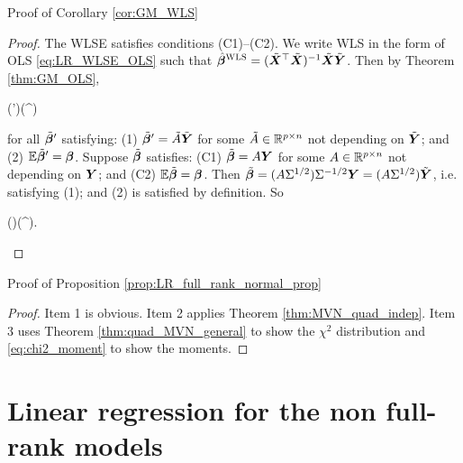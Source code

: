 \documentclass[10pt,a4paper]{book}
\begin{document}
\begin{pfbox}{Proof of Corollary \ref{cor:GM_WLS}}
	\begin{proof}
		The WLSE satisfies conditions (C1)--(C2).
		We write WLS in the form of OLS \eqref{eq:LR_WLSE_OLS} such that $\hat{{\boldsymbol\beta}}^{\textsc{WLS}}=(\tilde{{\boldsymbol X}}^\top\tilde{{\boldsymbol X}})^{-1}\tilde{{\boldsymbol X}}\tilde{{\boldsymbol Y}}$. 
		Then by Theorem \ref{thm:GM_OLS}, 
		\begin{sequation*}
			\Cov(\tilde{\bab}')\succeq \Cov(\hat{\bab}^{\WLS})
		\end{sequation*}
		for all $\tilde{{\boldsymbol\beta}}'$ satisfying: (1) $\tilde{{\boldsymbol\beta}}'=\tilde{A}\tilde{{\boldsymbol Y}}$ for some $\tilde{A}\in\mathbb R^{p\times n}$ not depending on $\tilde{{\boldsymbol Y}}$; and (2) $\mathbb E\tilde{{\boldsymbol\beta}}'={\boldsymbol\beta}$.
		Suppose $\tilde{{\boldsymbol\beta}}$ satisfies: (C1) $\tilde{{\boldsymbol\beta}}=A{\boldsymbol Y}$ for some $A\in\mathbb R^{p\times n}$ not depending on ${\boldsymbol Y}$; and (C2) $\mathbb E\tilde{{\boldsymbol\beta}}={\boldsymbol\beta}$.
		Then $\tilde{{\boldsymbol\beta}}=(A\Sigma^{1/2})\Sigma^{-1/2}{\boldsymbol Y}=(A\Sigma^{1/2})\tilde{{\boldsymbol Y}}$, i.e. satisfying (1); and (2) is satisfied by definition. 
		So 
		\begin{sequation*}
			\Cov(\tilde{\bab})\succeq \Cov(\hat{\bab}^{\WLS}).
		\end{sequation*}
	\end{proof}
\end{pfbox}

\begin{pfbox}{Proof of Proposition \ref{prop:LR_full_rank_normal_prop}}
	\begin{proof}
		Item 1 is obvious. Item 2 applies Theorem \ref{thm:MVN_quad_indep}. Item 3 uses Theorem \ref{thm:quad_MVN_general} to show the $\chi^2$ distribution and \eqref{eq:chi2_moment} to show the moments. 
	\end{proof}
\end{pfbox}


\section{Linear regression for the non full-rank models}\label{sec:LR_nonfull_rank}
\end{document}
